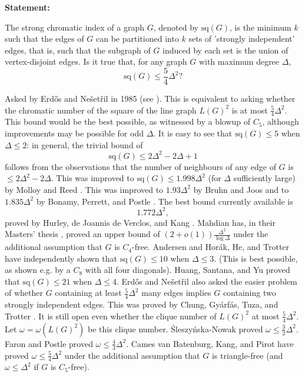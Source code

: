 \documentclass{article}
\begin{document}
\medskip

\noindent\textbf{Statement:}

The strong chromatic index of a graph $G$, denoted by $\mathrm{sq}(G)$, is the minimum $k$ such that the edges of $G$ can be partitioned into $k$ sets of 'strongly independent' edges, that is, such that the subgraph of $G$ induced by each set is the union of vertex-disjoint edges. Is it true that, for any graph $G$ with maximum degree $\Delta$,\[\mathrm{sq}(G)\leq\frac{5}{4}\Delta^2?\]




Asked by Erd\H{o}s and Ne\v{s}et\v{r}il in 1985 (see \cite{FGST89}). This is equivalent to asking whether the chromatic number of the square of the line graph $L(G)^2$ is at most $\frac{5}{4}\Delta^2$. This bound would be the best possible, as witnessed by a blowup of $C_5$, although improvements may be possible for odd $\Delta$. It is easy to see that $\mathrm{sq}(G)\leq 5$ when $\Delta\leq 2$: in general, the trivial bound of\[\mathrm{sq}(G)\leq 2\Delta^2-2\Delta+1\]follows from the observations that the number of neighbours of any edge of $G$ is $\leq 2\Delta^2-2\Delta$. This was improved to $\mathrm{sq}(G)\leq 1.998\Delta^2$ (for $\Delta$ sufficiently large) by Molloy and Reed \cite{MoRe97}. This was improved to $1.93\Delta^2$ by Bruhn and Joos \cite{BrJo18} and to $1.835\Delta^2$ by Bonamy, Perrett, and Postle \cite{BPP22}. The best bound currently available is\[1.772\Delta^2,\]proved by Hurley, de Joannis de Verclos, and Kang \cite{HJK22}. Mahdian has, in their Masters' thesis , proved an upper bound of $(2+o(1))\frac{\Delta^2}{\log \Delta}$ under the additional assumption that $G$ is $C_4$-free. Andersen \cite{92} and Hor\'{a}k, He, and Trotter \cite{HHT93} have independently shown that $\mathrm{sq}(G)\leq 10$ when $\Delta\leq 3$. (This is best possible, as shown e.g. by a $C_8$ with all four diagonals). Huang, Santana, and Yu \cite{HSY18} proved that $\mathrm{sq}(G)\leq 21$ when $\Delta\leq 4$. Erd\H{o}s and Ne\v{s}et\v{r}il also asked the easier problem of whether $G$ containing at least $\tfrac{5}{4}\Delta^2$ many edges implies $G$ containing two strongly independent edges. This was proved by Chung, Gy\'{a}rf\'{a}s, Tuza, and Trotter \cite{CGTT90}. It is still open even whether the clique number of $L(G)^2$ at most $\frac{5}{4}\Delta^2$. Let $\omega=\omega(L(G)^2)$ be this clique number. \'{S}leszy\'{n}ska-Nowak \cite{Sl16} proved $\omega \leq \frac{3}{2}\Delta^2$. Faron and Postle \cite{FaPo19} proved $\omega\leq \frac{4}{3}\Delta^2$. Cames van Batenburg, Kang, and Pirot \cite{CKP20} have proved $\omega\leq \frac{5}{4}\Delta^2$ under the additional assumption that $G$ is triangle-free (and $\omega\leq \Delta^2$ if $G$ is $C_5$-free).
\end{document}
